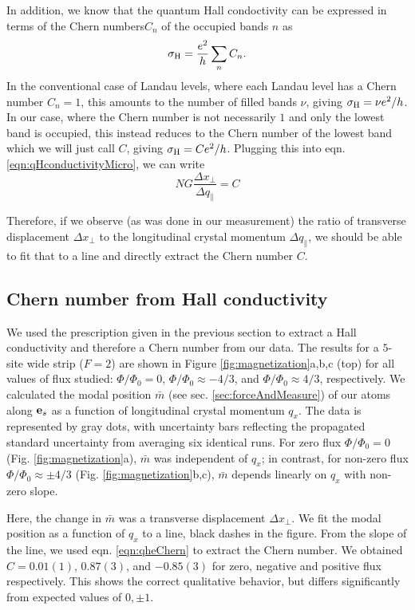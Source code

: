 In addition, we know that the quantum Hall condoctivity can be expressed in terms of the Chern numbers$C_n$ of the occupied bands $n$ as
\begin{equation}
 \sigma_{\rm{H}} = \frac{e^2}{h}\sum_n C_n.
\end{equation}
In the conventional case of Landau levels, where each Landau level has a Chern number $C_n=1$, this amounts to the number of filled bands $\nu$, giving $\sigma_{\rm{H}} = \nu e^2/h$. In our case, where the Chern number is not necessarily $1$ and only the lowest band is occupied, this instead reduces to the Chern number of the lowest band which we will just call $C$, giving $\sigma_{\rm{H}} = C e^2/h$. Plugging this into eqn. \ref{eqn:qHconductivityMicro}, we can write
\begin{equation}
N G\frac{\Delta x_{\perp}}{\Delta q_{\parallel}} = C
\label{eqn:qheChern}
\end{equation}

Therefore, if we observe (as was done in our measurement) the ratio of transverse displacement $\Delta x_{\perp}$ to the longitudinal crystal momentum $\Delta q_{\parallel}$, we should be able to fit that to a line and directly extract the Chern number $C$.

\subsection{Chern number from Hall conductivity}
We used the prescription given in the previous section to extract a Hall conductivity and therefore a Chern number from our data. The results for a $5$-site wide strip ($F=2$) are shown in Figure \ref{fig:magnetization}a,b,c (top) for all values of flux studied: $\Phi/\Phi_0 =0$, $\Phi/\Phi_0 \approx -4/3$, and  $\Phi/\Phi_0 \approx 4/3$, respectively. We calculated the modal position $\bar{m}$ (see sec. \ref{sec:forceAndMeasure}) of our atoms along $\textbf{e}_s{}$ as a function of longitudinal crystal momentum $q_x$.  The data is represented by gray dots, with uncertainty bars reflecting the propagated standard uncertainty from averaging six identical runs. For zero flux $\Phi/\Phi_0=0$ (Fig. \ref{fig:magnetization}a), $\bar{m}$ was independent of $q_x$; in contrast, for non-zero flux $\Phi/\Phi_0\approx\pm4/3$  (Fig. \ref{fig:magnetization}b,c),  $\bar{m}$ depends linearly on $q_x$ with non-zero slope.

Here, the change in $\bar{m}$ was a transverse displacement $\Delta x_{\perp}$. We fit the modal position as a function of $q_x$ to a line, black dashes in the figure. From the slope of the line, we used eqn. \ref{eqn:qheChern} to extract the Chern number. We obtained $C = 0.01(1)$, $0.87(3)$, and $-0.85(3)$ for zero, negative and positive flux respectively. This shows the correct qualitative behavior, but differs significantly from expected values of $0,\pm1$. 


